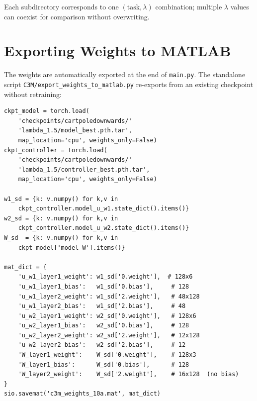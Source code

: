 \documentclass[11pt,a4paper]{article}
\begin{document}
Each subdirectory corresponds to one \((\text{task}, \lambda)\) combination; multiple \(\lambda\) values can coexist for comparison without overwriting.

\section{Exporting Weights to MATLAB}
\label{sec:c3m_export}

The weights are automatically exported at the end of \texttt{main.py}. The standalone script \texttt{C3M/\allowbreak{}export\_weights\_to\_matlab.py} re-exports from an existing checkpoint without retraining:

\begin{lstlisting}[style=python]
ckpt_model = torch.load(
    'checkpoints/cartpoledownwards/'
    'lambda_1.5/model_best.pth.tar',
    map_location='cpu', weights_only=False)
ckpt_controller = torch.load(
    'checkpoints/cartpoledownwards/'
    'lambda_1.5/controller_best.pth.tar',
    map_location='cpu', weights_only=False)

w1_sd = {k: v.numpy() for k,v in
    ckpt_controller.model_u_w1.state_dict().items()}
w2_sd = {k: v.numpy() for k,v in
    ckpt_controller.model_u_w2.state_dict().items()}
W_sd  = {k: v.numpy() for k,v in
    ckpt_model['model_W'].items()}

mat_dict = {
    'u_w1_layer1_weight': w1_sd['0.weight'],  # 128x6
    'u_w1_layer1_bias':   w1_sd['0.bias'],     # 128
    'u_w1_layer2_weight': w1_sd['2.weight'],   # 48x128
    'u_w1_layer2_bias':   w1_sd['2.bias'],     # 48
    'u_w2_layer1_weight': w2_sd['0.weight'],   # 128x6
    'u_w2_layer1_bias':   w2_sd['0.bias'],     # 128
    'u_w2_layer2_weight': w2_sd['2.weight'],   # 12x128
    'u_w2_layer2_bias':   w2_sd['2.bias'],     # 12
    'W_layer1_weight':    W_sd['0.weight'],    # 128x3
    'W_layer1_bias':      W_sd['0.bias'],      # 128
    'W_layer2_weight':    W_sd['2.weight'],    # 16x128  (no bias)
}
sio.savemat('c3m_weights_10a.mat', mat_dict)
\end{lstlisting}
\end{document}

